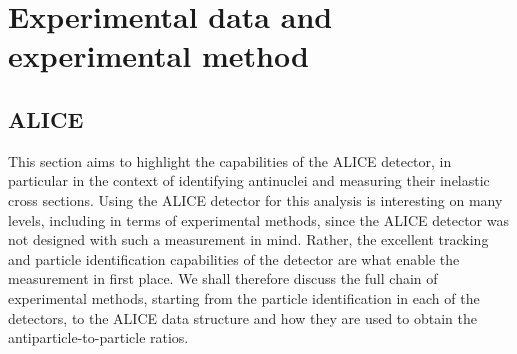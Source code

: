 \section{Experimental data and experimental method}

\subsection{ALICE}
This section aims to highlight the capabilities of the ALICE detector, in particular in the context of identifying antinuclei and measuring their inelastic cross sections. Using the ALICE detector for this analysis is interesting on many levels, including in terms of experimental methods, since the ALICE detector was not designed with such a measurement in mind. Rather, the excellent tracking and particle identification capabilities of the detector are what enable the measurement in first place. We shall therefore discuss the full chain of experimental methods, starting from the particle identification in each of the detectors, to the ALICE data structure and how they are used to obtain the antiparticle-to-particle ratios. 

